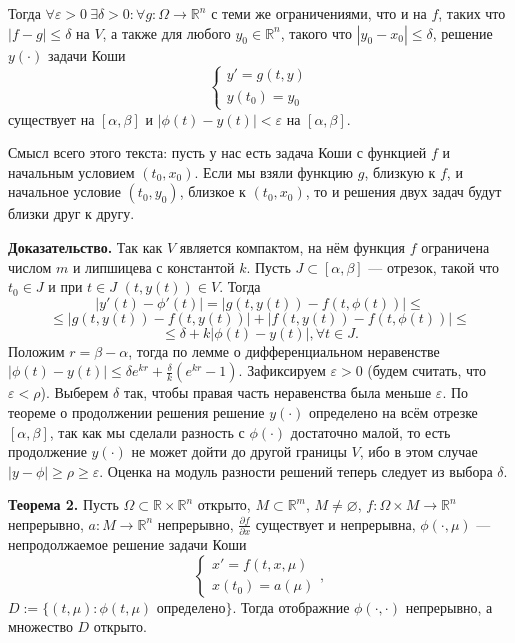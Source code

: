 Тогда $\forall \varepsilon > 0~\exists \delta > 0: \forall g: \Omega \to \mathbb R^n$ с теми же ограничениями, что и на $f$, таких что $|f - g| \le \delta$ на $V$, а также для любого $y_0 \in \mathbb R^n$, такого что $|y_0 - x_0| \le \delta$, решение $y(\cdot)$ задачи Коши
\[
    \begin{cases}
        y' = g(t, y) \\
        y(t_0) = y_0
    \end{cases}
\]
существует на $[\alpha, \beta]$ и $|\phi(t) - y(t)| < \varepsilon$ на $[\alpha, \beta]$.

Смысл всего этого текста: пусть у нас есть задача Коши с функцией $f$ и начальным условием $(t_0, x_0)$.
Если мы взяли функцию $g$, близкую к $f$, и начальное условие $(t_0, y_0)$, близкое к $(t_0, x_0)$, то и решения двух задач будут близки друг к другу.

\textbf{Доказательство.} Так как $V$ является компактом, на нём функция $f$ ограничена числом $m$ и липшицева с константой $k$.
Пусть $J \subset [\alpha, \beta]$ --- отрезок, такой что $t_0 \in J$ и при $t \in J$ $(t, y(t)) \in V$.
Тогда
\[
    |y'(t) - \phi'(t)| = |g(t, y(t)) - f(t, \phi(t))| \le
\]
\[
    \le |g(t, y(t)) - f(t, y(t))| + |f(t, y(t)) - f(t, \phi(t))| \le
\]
\[
    \le \delta +k|\phi(t) - y(t)|, \forall t \in J.
\]
Положим $r = \beta - \alpha$, тогда по лемме о дифференциальном неравенстве $|\phi(t) - y(t)| \le \delta e^{kr} + \frac{\delta}{k} (e^{kr} - 1)$.
Зафиксируем $\varepsilon > 0$ (будем считать, что $\varepsilon < \rho$).
Выберем $\delta$ так, чтобы правая часть неравенства была меньше $\varepsilon$.
По теореме о продолжении решения решение $y(\cdot)$ определено на всём отрезке $[\alpha, \beta]$, так как мы сделали разность с $\phi(\cdot)$ достаточно малой, то есть продолжение $y(\cdot)$ не может дойти до другой границы $V$, ибо в этом случае $|y - \phi| \ge \rho \ge \varepsilon$.
Оценка на модуль разности решений теперь следует из выбора $\delta$.

\QED

\textbf{Теорема 2.} Пусть $\Omega \subset \mathbb R \times \mathbb R^n$ открыто, $M \subset \mathbb R^m$, $M \ne \varnothing$, $f: \Omega \times M \to \mathbb R^n$ непрерывно, $a: M \to \mathbb R^n$ непрерывно, $\frac{\partial f}{\partial x}$ существует и непрерывна, $\phi(\cdot, \mu)$ --- непродолжаемое решение задачи Коши
\[
    \begin{cases}
        x' = f(t, x, \mu) \\
        x(t_0) = a(\mu)
    \end{cases},
\]
$D := \{(t, \mu): \text{$\phi(t, \mu)$ определено}\}$.
Тогда отображние $\phi(\cdot, \cdot)$ непрерывно, а множество $D$ открыто.

